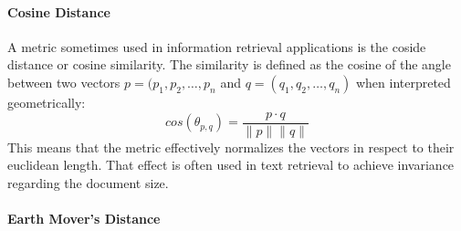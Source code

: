 \paragraph{Cosine Distance}

A metric sometimes used in information retrieval applications is the coside
distance or cosine similarity. The similarity is defined as the cosine of the
angle between two vectors $p = (p_1, p_2, \dots, p_n$ and $q = (q_1, q_2,
\dots, q_n)$ when interpreted geometrically:
\begin{equation*}
    cos(\theta_{p, q}) = \frac{p \cdot q}{\|p\| \|q\|}
\end{equation*}
This means that the metric effectively normalizes the vectors in respect to
their euclidean length. That effect is often used in text retrieval to achieve
invariance regarding the document size.

\paragraph{Earth Mover's Distance}

